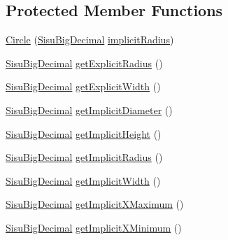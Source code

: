 \subsection*{Protected Member Functions}
\begin{DoxyCompactItemize}
\item 
\hyperlink{classcom_1_1aarrelaakso_1_1drawl_1_1_circle_a8137fc064c1c7ce86fed179b56be9ab5}{Circle} (\hyperlink{classcom_1_1aarrelaakso_1_1drawl_1_1_sisu_big_decimal}{Sisu\+Big\+Decimal} \hyperlink{classcom_1_1aarrelaakso_1_1drawl_1_1_circle_a44419c5eba485de9b3dc2d8092be4e19}{implicit\+Radius})
\item 
\hyperlink{classcom_1_1aarrelaakso_1_1drawl_1_1_sisu_big_decimal}{Sisu\+Big\+Decimal} \hyperlink{classcom_1_1aarrelaakso_1_1drawl_1_1_circle_a1fd7180d686a72b1631a51f0c34f5690}{get\+Explicit\+Radius} ()
\item 
\hyperlink{classcom_1_1aarrelaakso_1_1drawl_1_1_sisu_big_decimal}{Sisu\+Big\+Decimal} \hyperlink{classcom_1_1aarrelaakso_1_1drawl_1_1_circle_ab12f4d0269b029217c11ba98755f4348}{get\+Explicit\+Width} ()
\item 
\hyperlink{classcom_1_1aarrelaakso_1_1drawl_1_1_sisu_big_decimal}{Sisu\+Big\+Decimal} \hyperlink{classcom_1_1aarrelaakso_1_1drawl_1_1_circle_afdf1eafa90768ab10a9a6ceb25941e34}{get\+Implicit\+Diameter} ()
\item 
\hyperlink{classcom_1_1aarrelaakso_1_1drawl_1_1_sisu_big_decimal}{Sisu\+Big\+Decimal} \hyperlink{classcom_1_1aarrelaakso_1_1drawl_1_1_circle_a634a3118425b7aa555ef14d0b4441a93}{get\+Implicit\+Height} ()
\item 
\hyperlink{classcom_1_1aarrelaakso_1_1drawl_1_1_sisu_big_decimal}{Sisu\+Big\+Decimal} \hyperlink{classcom_1_1aarrelaakso_1_1drawl_1_1_circle_a8991b4ff460833d4198dc692241f142f}{get\+Implicit\+Radius} ()
\item 
\hyperlink{classcom_1_1aarrelaakso_1_1drawl_1_1_sisu_big_decimal}{Sisu\+Big\+Decimal} \hyperlink{classcom_1_1aarrelaakso_1_1drawl_1_1_circle_a062c441fca2adcc959e236d7352bea55}{get\+Implicit\+Width} ()
\item 
\hyperlink{classcom_1_1aarrelaakso_1_1drawl_1_1_sisu_big_decimal}{Sisu\+Big\+Decimal} \hyperlink{classcom_1_1aarrelaakso_1_1drawl_1_1_circle_acb7e453b97a2800eaf52d209f9759bf6}{get\+Implicit\+X\+Maximum} ()
\item 
\hyperlink{classcom_1_1aarrelaakso_1_1drawl_1_1_sisu_big_decimal}{Sisu\+Big\+Decimal} \hyperlink{classcom_1_1aarrelaakso_1_1drawl_1_1_circle_ac7ed577bb645a1f136b221feda9e6dfc}{get\+Implicit\+X\+Minimum} ()

\end{DoxyCompactItemize}
